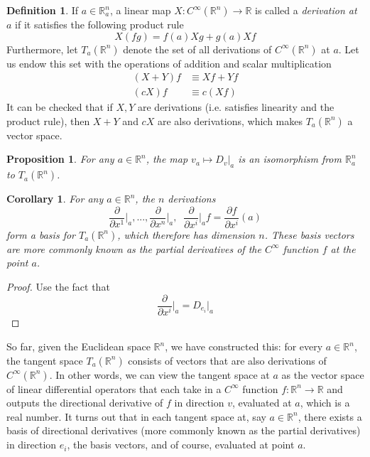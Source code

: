 \documentclass{article}
\newtheorem{proposition}[theorem]{Proposition}
\newtheorem{corollary}{Corollary}[theorem]
\theoremstyle{remark}
\theoremstyle{definition}
\newtheorem{definition}{Definition}[section]
\begin{document}
\begin{definition}
If $a \in \mathbb{R}^n_a$, a linear map $X: C^\infty (\mathbb{R}^n) \longrightarrow \mathbb{R}$ is called a \textit{derivation at $a$} if it satisfies the following product rule 
\[X (f g) = f(a) X g + g(a) X f\]
Furthermore, let $T_a (\mathbb{R}^n)$ denote the set of all derivations of $C^\infty (\mathbb{R}^n)$ at $a$. Let us endow this set with the operations of addition and scalar multiplication 
\begin{align*}
    (X + Y) f & \equiv X f + Y f \\
    (c X) f & \equiv c (X f)
\end{align*}
It can be checked that if $X, Y$ are derivations (i.e. satisfies linearity and the product rule), then $X + Y$ and $c X$ are also derivations, which makes $T_a (\mathbb{R}^n)$ a vector space. 
\end{definition}

\begin{proposition}
For any $a \in \mathbb{R}^n$, the map $v_a \mapsto D_v |_a$ is an isomorphism from $\mathbb{R}_a^n$ to $T_a (\mathbb{R}^n)$. 
\end{proposition}

\begin{corollary}
For any $a \in \mathbb{R}^n$, the $n$ derivations 
\[\frac{\partial}{\partial x^1} \bigg|_a, ..., \frac{\partial}{\partial x^n} \bigg|_a, \;\; \frac{\partial}{\partial x^i} \bigg|_a f = \frac{\partial f}{\partial x^i} (a)\]
form a basis for $T_a (\mathbb{R}^n)$, which therefore has dimension $n$. These basis vectors are more commonly known as the partial derivatives of the $C^\infty$ function $f$ at the point $a$. 
\end{corollary}
\begin{proof}
Use the fact that 
\[\frac{\partial}{\partial x^i} \bigg|_a = D_{e_i} \big|_a\]
\end{proof}

So far, given the Euclidean space $\mathbb{R}^n$, we have constructed this: for every $a \in \mathbb{R}^n$, the tangent space $T_a (\mathbb{R}^n)$ consists of vectors that are also derivations of $C^\infty (\mathbb{R}^n)$. In other words, we can view the tangent space at $a$ as the vector space of linear differential operators that each take in a $C^\infty$ function $f: \mathbb{R}^n \longrightarrow \mathbb{R}$ and outputs the directional derivative of $f$ in direction $v$, evaluated at $a$, which is a real number. It turns out that in each tangent space at, say $a \in \mathbb{R}^n$, there exists a basis of directional derivatives (more commonly known as the partial derivatives) in direction $e_i$, the basis vectors, and of course, evaluated at point $a$. 
\end{document}
